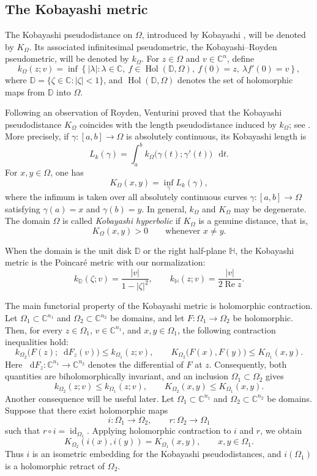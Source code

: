 \documentclass[11pt]{article}
\theoremstyle{definition}
\newcommand{\C}{\mathbb{C}}
\newcommand{\D}{\mathbb{D}}
\newcommand{\HH}{\mathbb{H}}
\newcommand{\Hol}{\operatorname{Hol}}
\newcommand{\dd}{\mathop{}\!\mathrm{d}}
\renewcommand{\Re}{\operatorname{Re}}
\begin{document}
\subsection{The Kobayashi metric}


The Kobayashi pseudodistance on \(\Omega\), introduced by Kobayashi \cite{Kobayashi}, will be denoted by \(K_\Omega\). Its associated infinitesimal pseudometric, the Kobayashi--Royden pseudometric, will be denoted by \(k_\Omega\). For \(z\in\Omega\) and \(v\in\C^n\), define
\[
k_\Omega(z;v)=\inf\left\{|\lambda|:\lambda\in\C,\ f\in\Hol(\D,\Omega),\ f(0)=z,\ \lambda f'(0)=v\right\},
\]
where \(\D=\{\zeta\in\C:|\zeta|<1\}\), and \(\Hol(\D,\Omega)\) denotes the set of holomorphic maps from \(\D\) into \(\Omega\).

Following an observation of Royden, Venturini proved that the Kobayashi pseudodistance \(K_\Omega\) coincides with the length pseudodistance induced by \(k_\Omega\); see \cite{Royden,Venturini}. More precisely, if \(\gamma:[a,b]\to\Omega\) is absolutely continuous, its Kobayashi length is
\[
L_k(\gamma)=\int_a^b k_\Omega\bigl(\gamma(t);\gamma'(t)\bigr)\,\dd t.
\]
For \(x,y\in\Omega\), one has
\[
K_\Omega(x,y)=\inf_\gamma L_k(\gamma),
\]
where the infimum is taken over all absolutely continuous curves \(\gamma:[a,b]\to\Omega\) satisfying \(\gamma(a)=x\) and \(\gamma(b)=y\).
In general, \(k_\Omega\) and \(K_\Omega\) may be degenerate.  The domain
\(\Omega\) is called \emph{Kobayashi hyperbolic} if \(K_\Omega\) is a
genuine distance, that is,
\[
K_\Omega(x,y)>0
\qquad\text{whenever }x\ne y.
\]

When the domain is the unit disk \(\D\) or the right half-plane \(\HH\),
the Kobayashi metric is the Poincar\'e metric with our normalization:
\[
 k_\D(\zeta;v)=\frac{|v|}{1-|\zeta|^2},
 \qquad
 k_\HH(z;v)=\frac{|v|}{2\Re z}.
\]

The main functorial property of the Kobayashi metric is holomorphic
contraction. Let \(\Omega_1\subset\C^{n_1}\) and
\(\Omega_2\subset\C^{n_2}\) be domains, and let
\(F:\Omega_1\to\Omega_2\) be holomorphic. Then, for every
\(z\in\Omega_1\), \(v\in\C^{n_1}\), and \(x,y\in\Omega_1\),
the following contraction inequalities hold:
\[
k_{\Omega_2}\bigl(F(z);\dd F_z(v)\bigr)
\le
k_{\Omega_1}(z;v),
\qquad
K_{\Omega_2}\bigl(F(x),F(y)\bigr)
\le
K_{\Omega_1}(x,y).
\]
Here \(\dd F_z:\C^{n_1}\to\C^{n_2}\) denotes the differential of \(F\)
at \(z\).
Consequently, both quantities are biholomorphically invariant, and an inclusion
\(\Omega_1\subset\Omega_2\) gives
\[
 k_{\Omega_2}(z;v)\le k_{\Omega_1}(z;v),
 \qquad
 K_{\Omega_2}(x,y)\le K_{\Omega_1}(x,y).
\]
Another consequence will be useful later. Let \(\Omega_1\subset\C^{n_1}\) and \(\Omega_2\subset\C^{n_2}\) be domains. Suppose that there exist holomorphic maps
\[
i:\Omega_1\to\Omega_2,\qquad r:\Omega_2\to\Omega_1
\]
such that \(r\circ i=\operatorname{id}_{\Omega_1}\). Applying holomorphic contraction to \(i\) and \(r\), we obtain
\[
K_{\Omega_2}(i(x),i(y))=K_{\Omega_1}(x,y),\qquad x,y\in\Omega_1.
\]
Thus \(i\) is an isometric embedding for the Kobayashi pseudodistances, and \(i(\Omega_1)\) is a holomorphic retract of \(\Omega_2\).
\end{document}
